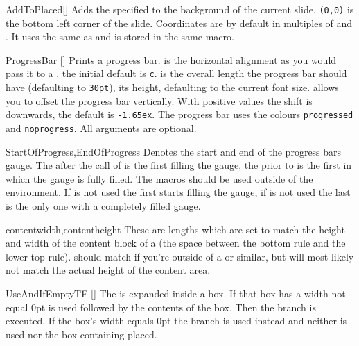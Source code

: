 \begin{describemacro}{AddToPlaced}[]
  Adds the specified  to the background of the current slide.
  \texttt{(0,0)} is the bottom left corner of the slide. Coordinates are by
  default in multiples of  and . It uses the same
   as  and is stored in the same macro.
\end{describemacro}

\begin{describemacro}{ProgressBar}%
  []
  Prints a progress bar.  is the horizontal alignment as you would
  pass it to a , the initial default is \texttt{c}.  is
  the overall length the progress bar should have (defaulting to \texttt{30pt}),
   its height, defaulting to the current font size. 
  allows you to offset the progress bar vertically. With positive values the
  shift is downwards, the default is \texttt{-1.65ex}. The progress bar uses the
   colours \texttt{progressed} and \texttt{noprogress}. All
  arguments are optional.
\end{describemacro}

\begin{describemacro}{StartOfProgress,EndOfProgress}
  Denotes the start and end of the progress bars gauge. The  after
  the call of  is the first  filling the gauge,
  the  prior to  is the first  in which
  the gauge is fully filled. The macros should be used outside of the
   environment. If  is not used the first
   starts filling the gauge, if  is not used the
  last  is the only one with a completely filled gauge.
\end{describemacro}

\begin{describemacro}{contentwidth,contentheight}
  These are lengths which are set to match the height and width of the content
  block of a  (the space between the bottom rule and the lower top
  rule).  should match  if you're outside of a
   or similar, but  will most likely not match the
  actual height of the content area.
\end{describemacro}

\begin{describemacro}{UseAndIfEmptyTF}%
  []
  The  is expanded inside a box. If that box has a width not equal 0pt
   is used followed by the contents of the box. Then the 
  branch is executed. If the box's width equals 0pt the  branch is
  used instead and neither  is used nor the box containing 
  placed.
\end{describemacro}

